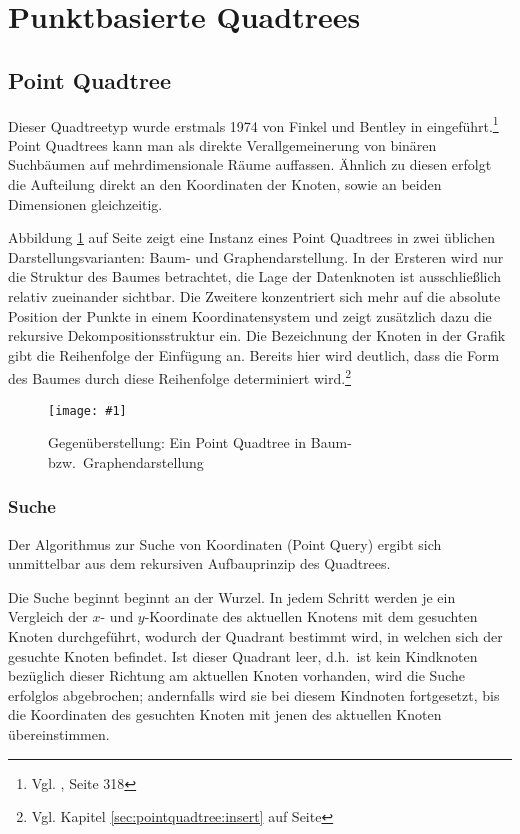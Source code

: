 \documentclass[%
			paper=a4,%
			DIV12,
			draft=false,%
			titlepage
			]{scrartcl}
\newcommand{\zit}[3]{#1 \cite{#2}, #3}
\newcommand{\footzit}[3]{\footnote{\zit{#1}{#2}{#3}}}
\newcommand{\myfig}[4] {
 \begin{figure}[tbph]
	 \centering
	 \texttt{[image: \#1]}
	 \caption{#4}
	 \label{fig:#2}
 \end{figure}
}
\begin{document}
\section{Punktbasierte Quadtrees}
\subsection{Point Quadtree}
Dieser Quadtreetyp wurde erstmals 1974 von Finkel und Bentley in \cite{DBLP:journals/acta/FinkelB74} eingeführt.\footzit{Vgl.}{compgeom:2000}{Seite 318}
Point Quadtrees kann man als direkte Verallgemeinerung von binären Suchbäumen auf mehrdimensionale Räume auffassen. 
Ähnlich zu diesen erfolgt die Aufteilung direkt an den Koordinaten der Knoten, sowie an beiden Dimensionen gleichzeitig. 


Abbildung \ref{fig:pointquadtree} auf Seite \pageref{fig:pointquadtree} zeigt eine Instanz eines Point Quadtrees in zwei üblichen Darstellungsvarianten: Baum- und Graphendarstellung.
In der Ersteren wird nur die Struktur des Baumes betrachtet, die Lage der Datenknoten ist ausschließlich relativ zueinander sichtbar.
Die Zweitere konzentriert sich mehr auf die absolute Position der Punkte in einem Koordinatensystem und zeigt zusätzlich dazu die rekursive Dekompositionsstruktur ein.
Die Bezeichnung der Knoten in der Grafik gibt die Reihenfolge der Einfügung an. Bereits hier wird deutlich, dass die Form des Baumes durch diese Reihenfolge determiniert wird.\footnote{Vgl. Kapitel \ref{sec:pointquadtree:insert} auf Seite \pageref{sec:pointquadtree:insert}}
\myfig{img/pointquadtree-ins7+tree-trimmed}{pointquadtree}{width=.9\textwidth}{Gegenüberstellung: Ein Point Quadtree in Baum- bzw.\ Graphendarstellung}

\subsubsection{Suche}
\label{sec:pointquadtree-suche}
Der Algorithmus zur Suche von Koordinaten (Point Query) ergibt sich unmittelbar aus dem rekursiven Aufbauprinzip des Quadtrees. 

Die Suche beginnt beginnt an der Wurzel. In jedem Schritt werden je ein Vergleich der $x$- und $y$-Koordinate des aktuellen Knotens mit dem gesuchten Knoten durchgeführt, wodurch der Quadrant bestimmt wird, in welchen sich der gesuchte Knoten befindet. Ist dieser Quadrant leer, d.h.\ ist kein Kindknoten bezüglich dieser Richtung am aktuellen Knoten vorhanden, wird die Suche erfolglos abgebrochen; andernfalls wird sie bei diesem Kindnoten fortgesetzt, bis die Koordinaten des gesuchten Knoten mit jenen des aktuellen Knoten übereinstimmen.
\end{document}
